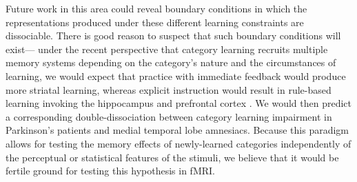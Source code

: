 \documentclass[twocolumn]{svjour3}          %
\begin{document}
Future work in this area could reveal boundary conditions in which the
representations produced under these different learning constraints
are dissociable. There is good reason to suspect that such boundary
conditions will exist--- under the recent perspective that category
learning recruits multiple memory systems depending on the category's
nature and the circumstances of learning, we would expect that
practice with immediate feedback would produce more striatal learning,
whereas explicit instruction would result in rule-based learning
invoking the hippocampus and prefrontal cortex \cite{Ashby2011}. We
would then predict a corresponding double-dissociation between
category learning impairment in Parkinson's patients and medial
temporal lobe amnesiacs. Because this paradigm allows for testing the
memory effects of newly-learned categories independently of the
perceptual or statistical features of the stimuli, we believe that it
would be fertile ground for testing this hypothesis in fMRI.

\begin{acknowledgements}
\end{acknowledgements}

 
\end{document}
